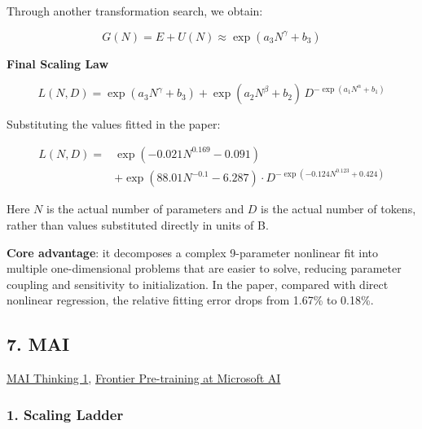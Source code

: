 \documentclass[
  english,
  11pt,
  a4paper,
]{article}
\newenvironment{NotesFormula}{%
  \par\noindent\begin{minipage}{\linewidth}%
  \setlength{\parindent}{2em}%
  \setlength{\parskip}{0.35em}%
}{\end{minipage}\par}
\begin{document}
\begin{NotesFormula}

Through another transformation search, we obtain:

\[\boxed{G(N)=E+U(N)\approx\exp(a_3N^\gamma+b_3)}\]

\end{NotesFormula}

\begin{NotesFormula}

\textbf{Final Scaling Law}

\[\boxed{L(N,D)=\exp(a_3N^\gamma+b_3)+\exp(a_2N^\beta+b_2)\,D^{-\exp(a_1N^\alpha+b_1)}}\]

\end{NotesFormula}

\begin{NotesFormula}

Substituting the values fitted in the paper:

\[\boxed{
\begin{aligned}
L(N,D)={}&\exp\!\left(-0.021N^{0.169}-0.091\right)\\
&+\exp\!\left(88.01N^{-0.1}-6.287\right)\cdot D^{-\exp\left(-0.124N^{0.123}+0.424\right)}
\end{aligned}}\]

\end{NotesFormula}

Here \(N\) is the actual number of parameters and \(D\) is the actual
number of tokens, rather than values substituted directly in units of B.

\textbf{Core advantage}: it decomposes a complex 9-parameter nonlinear
fit into multiple one-dimensional problems that are easier to solve,
reducing parameter coupling and sensitivity to initialization. In the
paper, compared with direct nonlinear regression, the relative fitting
error drops from 1.67\% to 0.18\%.

\clearpage

\subsection{7. MAI}\label{mai}

\href{https://microsoft.ai/pdf/mai-thinking-1.pdf}{MAI Thinking 1},
\href{https://microsoft.ai/news/frontier-pre-training-at-microsoft-ai/}{Frontier
Pre-training at Microsoft AI}

\subsubsection{1. Scaling Ladder}\label{scaling-ladder}
\end{document}
